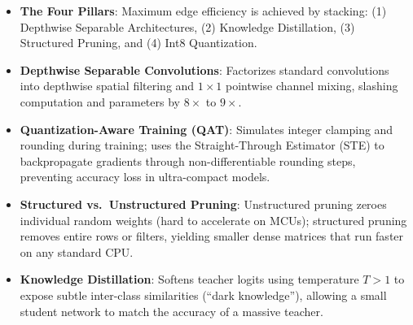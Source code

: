 \begin{takeaways}
\begin{itemize}
    \item \textbf{The Four Pillars}: Maximum edge efficiency is achieved by stacking: (1) Depthwise Separable Architectures, (2) Knowledge Distillation, (3) Structured Pruning, and (4) Int8 Quantization.
    \item \textbf{Depthwise Separable Convolutions}: Factorizes standard convolutions into depthwise spatial filtering and $1 \times 1$ pointwise channel mixing, slashing computation and parameters by $8\times$ to $9\times$.
    \item \textbf{Quantization-Aware Training (QAT)}: Simulates integer clamping and rounding during training; uses the Straight-Through Estimator (STE) to backpropagate gradients through non-differentiable rounding steps, preventing accuracy loss in ultra-compact models.
    \item \textbf{Structured vs.\ Unstructured Pruning}: Unstructured pruning zeroes individual random weights (hard to accelerate on MCUs); structured pruning removes entire rows or filters, yielding smaller dense matrices that run faster on any standard CPU.
    \item \textbf{Knowledge Distillation}: Softens teacher logits using temperature $T > 1$ to expose subtle inter-class similarities (``dark knowledge''), allowing a small student network to match the accuracy of a massive teacher.
\end{itemize}
\end{takeaways}

